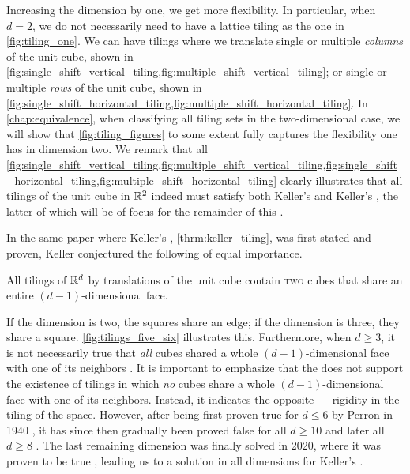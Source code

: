 \documentclass[../thesis.tex]{subfiles}
\begin{document}
Increasing the dimension by one, we get more flexibility. In particular, when $d=2$, we do not necessarily need to have a lattice tiling as the one in \cref{fig:tiling_one}. We can have tilings where we translate single or multiple \emph{columns} of the unit cube, shown in \cref{fig:single_shift_vertical_tiling,fig:multiple_shift_vertical_tiling}; or single or multiple \emph{rows} of the unit cube, shown in \cref{fig:single_shift_horizontal_tiling,fig:multiple_shift_horizontal_tiling}. In \cref{chap:equivalence}, when classifying all tiling sets in the two-dimensional case, we will show that \cref{fig:tiling_figures} to some extent fully captures the flexibility one has in dimension two. We remark that all \cref{fig:single_shift_vertical_tiling,fig:multiple_shift_vertical_tiling,fig:single_shift_horizontal_tiling,fig:multiple_shift_horizontal_tiling} clearly illustrates that all tilings of the unit cube in $\mathbb{R}^2$ indeed must satisfy both Keller's  and Keller's , the latter of which will be of focus for the remainder of this .



In the same paper \cite{kellerUberLuckenloseErfullung1930} where Keller's , \cref{thrm:keller_tiling}, was first stated and proven, Keller conjectured the following of equal importance.

\begin{conjecture}\label{conj:keller_tiling}
    All tilings of $\mathbb{R}^d$ by translations of the unit cube contain \textsc{two} cubes that share an entire $(d-1)$-dimensional face.
\end{conjecture}  %



If the dimension is two, the squares share an edge; if the dimension is three, they share a square. \cref{fig:tilings_five_six} illustrates this. Furthermore, when $d\geq 3$, it is not necessarily true that \emph{all} cubes shared a whole $(d-1)$-dimensional face with one of its neighbors \cite{perronUeberLueckenloseAusfuellung1940}. It is important to emphasize that the  does not support the existence of tilings in which \emph{no} cubes share a whole $(d-1)$-dimensional face with one of its neighbors. Instead, it indicates the opposite — rigidity in the tiling of the space. However, after being first proven true for $d\leq 6$ by Perron in 1940 \cite{perronModulartigeLueckenloseAusfuellung1940,perronModulartigeLueckenloseAusfuellung1940a}, it has since then gradually been proved false for all $d\geq10$ \cite{lagariasKellerCubetilingConjecture1992} and later all $d\geq8$ \cite{mackeyCubeTilingDimension2002}. The last remaining dimension was finally solved in 2020, where it was proven to be true \cite{brakensiekResolutionKellerConjecture2020}, leading us to a solution in all dimensions for Keller's .%
\end{document}
